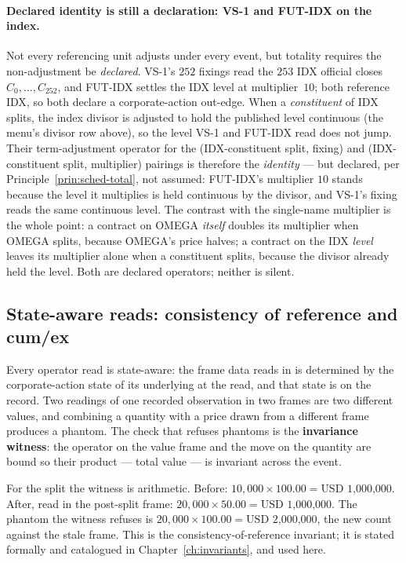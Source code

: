 \documentclass[11pt,a4paper]{article}
\newcommand{\USD}[1]{\mbox{USD~#1}}
\begin{document}
\paragraph{Declared identity is still a declaration: VS-1 and FUT-IDX on the index.} Not every
referencing unit adjusts under every event, but totality requires the non-adjustment be
\emph{declared}. VS-1's $252$ fixings read the $253$ IDX official closes $C_0,\dots,C_{252}$, and FUT-IDX settles the IDX
level at multiplier~$10$; both reference IDX, so both declare a corporate-action out-edge. When
a \emph{constituent} of IDX splits, the index divisor is adjusted to hold the published level
continuous (the menu's divisor row above), so the level VS-1 and FUT-IDX read does not jump.
Their term-adjustment operator for the (IDX-constituent split, fixing) and (IDX-constituent
split, multiplier) pairings is therefore the \emph{identity} --- but declared, per
Principle~\ref{prin:sched-total}, not assumed: FUT-IDX's multiplier $10$ stands because the
level it multiplies is held continuous by the divisor, and VS-1's fixing reads the same
continuous level. The contrast with the single-name multiplier is the whole point: a contract
on OMEGA \emph{itself} doubles its multiplier when OMEGA splits, because OMEGA's price halves;
a contract on the IDX \emph{level} leaves its multiplier alone when a constituent splits,
because the divisor already held the level. Both are declared operators; neither is silent.

\subsection{State-aware reads: consistency of reference and cum/ex}\label{sec:witness}

Every operator read is state-aware: the frame data reads in is determined by the
corporate-action state of its underlying at the read, and that state is on the record. Two
readings of one recorded observation in two frames are two different values, and combining a
quantity with a price drawn from a different frame produces a phantom. The check that
refuses phantoms is the \textbf{invariance witness}: the operator on the value frame and
the move on the quantity are bound so their product --- total value --- is invariant across
the event.

For the split the witness is arithmetic. Before: $10{,}000 \times 100.00 = \USD{1{,}000{,}000}$.
After, read in the post-split frame: $20{,}000 \times 50.00 = \USD{1{,}000{,}000}$. The
phantom the witness refuses is $20{,}000 \times 100.00 = \USD{2{,}000{,}000}$, the new count
against the stale frame. This is the consistency-of-reference invariant; it is stated
formally and catalogued in Chapter~\ref{ch:invariants}, and used here.
\end{document}
